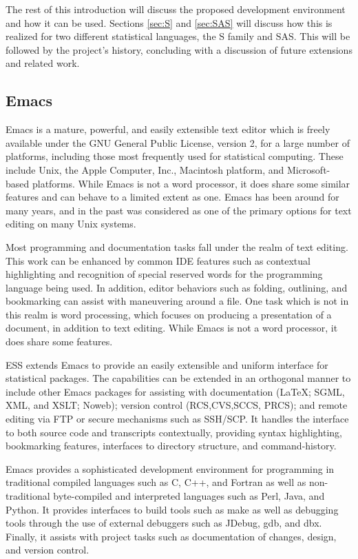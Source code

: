 \documentclass{article}
\begin{document}
The rest of this introduction will discuss the proposed development
environment and how it can be used.  Sections \ref{sec:S} and
\ref{sec:SAS} will discuss how this is realized for two different
statistical languages, the S family and SAS.  This will be followed by
the project's history, concluding with a discussion of future
extensions and related work.

\subsection{Emacs}
\label{sec:intro:emacs}

Emacs \citep{RMS:2000} is a mature, powerful, and easily extensible
text editor which is freely available under the GNU General Public
License, version 2, for a large number of platforms, including those
most frequently used for statistical computing.  These include Unix,
the Apple Computer, Inc., Macintosh platform, and Microsoft-based
platforms.  While Emacs is not a word processor, it does share some
similar features and can behave to a limited extent as one.  Emacs has
been around for many years, and in the past was considered as one of
the primary options for text editing on many Unix systems.

Most programming and documentation tasks fall under the realm of text
editing.  This work can be enhanced by common IDE features such as
contextual highlighting and recognition of special reserved words for
the programming language being used.  In addition, editor behaviors
such as folding, outlining, and bookmarking can assist with
maneuvering around a file.  One task which is not in this realm is
word processing, which focuses on producing a presentation of a
document, in addition to text editing.  While Emacs is not a word
processor, it does share some features.

ESS extends Emacs to provide an easily extensible and uniform
interface for statistical packages.  The capabilities can be extended
in an orthogonal manner to include other Emacs packages for assisting
with documentation (\LaTeX; SGML, XML, and XSLT; Noweb); version
control (RCS,CVS,SCCS, PRCS); and remote editing via FTP or secure
mechanisms such as SSH/SCP.  It handles the interface to both source
code and transcripts contextually, providing syntax highlighting,
bookmarking features, interfaces to directory structure, and
command-history.

Emacs provides a sophisticated development environment for programming
in traditional compiled languages such as C, C++, and Fortran as well
as non-traditional byte-compiled and interpreted languages such as
Perl, Java, and Python.  It provides interfaces to build tools such as
make as well as debugging tools through the use of external debuggers
such as JDebug, gdb, and dbx.  Finally, it assists with project tasks
such as documentation of changes, design, and version control.
\end{document}
